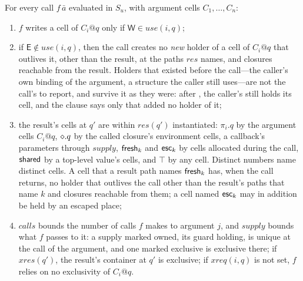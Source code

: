 \begin{lemma}
\label{lem:summary}
For every call $f\,\bar a$ evaluated in $S_u$, with argument cells $C_1, \ldots, C_n$:
\begin{enumerate}
\item $f$ writes a cell of $C_i@q$ only if $\mathsf{W} \in \mathit{use}(i, q)$;
\item if $\mathsf{E} \notin \mathit{use}(i, q)$, then the call creates no \emph{new} holder of a cell of
$C_i@q$ that outlives it, other than the result, at the paths $\mathit{res}$ names, and closures reachable
from the result. Holders that existed before the call---the caller's own binding of the argument, a
structure the caller still uses---are not the call's to report, and survive it as they were: after
, the caller's  still holds its cell, and the clause says only that
 added no holder of it;
\item the result's cells at $q'$ are within $\mathit{res}(q')$ instantiated: $\pi_i.q$ by the argument
cells $C_i@q$, $\diamond.q$ by the called closure's environment cells, a callback's parameters through
$\mathit{supply}$, $\mathsf{fresh}_k$ and $\mathsf{esc}_k$ by cells allocated during the call, $\mathsf{shared}$ by a top-level
value's cells, and $\top$ by any cell. Distinct numbers name distinct cells. A cell that a result path
names $\mathsf{fresh}_k$ has, when the call returns, no holder that outlives the call other than the result's
paths that name $k$ and closures reachable from them; a cell named $\mathsf{esc}_k$ may in addition be held by an
escaped place;
\item $\mathit{calls}$ bounds the number of calls $f$ makes to argument $j$, and $\mathit{supply}$ bounds
what $f$ passes to it: a supply marked owned, its guard holding, is unique at the call of the argument,
and one marked exclusive is exclusive there; if $\mathit{xres}(q')$, the result's container at $q'$ is
exclusive; if $\mathit{xreq}(i, q)$ is not set, $f$ relies on no exclusivity of $C_i@q$.
\end{enumerate}
\end{lemma}
